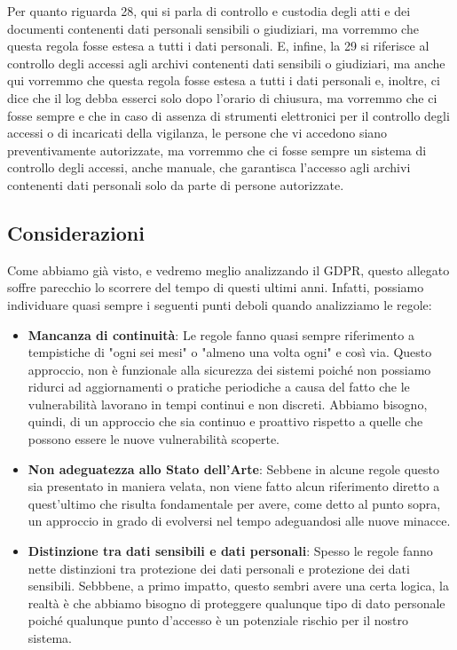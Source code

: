 Per quanto riguarda 28, qui si parla di controllo e custodia degli atti e dei documenti contenenti dati personali sensibili o giudiziari, ma vorremmo che questa regola fosse estesa a tutti i dati personali.
E, infine, la 29 si riferisce al controllo degli accessi agli archivi contenenti dati sensibili o giudiziari, ma anche qui vorremmo che questa regola fosse estesa a tutti i dati personali e, inoltre, ci dice che il log debba esserci solo dopo l'orario di chiusura, ma vorremmo che ci fosse sempre e che in caso di assenza di strumenti elettronici per il controllo degli accessi o di incaricati della vigilanza, le persone che vi accedono siano preventivamente autorizzate, ma vorremmo che ci fosse sempre un sistema di controllo degli accessi, anche manuale, che garantisca l'accesso agli archivi contenenti dati personali solo da parte di persone autorizzate.

\subsection{Considerazioni}
Come abbiamo già visto, e vedremo meglio analizzando il GDPR, questo allegato soffre parecchio lo scorrere del tempo di questi ultimi anni.
Infatti, possiamo individuare quasi sempre i seguenti punti deboli quando analizziamo le regole:
\begin{itemize}
    \item \textbf{Mancanza di continuità}: Le regole fanno quasi sempre riferimento a tempistiche di "ogni sei mesi" o "almeno una volta ogni" e così via.
    Questo approccio, non è funzionale alla sicurezza dei sistemi poiché non possiamo ridurci ad aggiornamenti o pratiche periodiche a causa del fatto che le vulnerabilità lavorano in tempi continui e non discreti.
    Abbiamo bisogno, quindi, di un approccio che sia continuo e proattivo rispetto a quelle che possono essere le nuove vulnerabilità scoperte.
    \item \textbf{Non adeguatezza allo Stato dell'Arte}: Sebbene in alcune regole questo sia presentato in maniera velata, non viene fatto alcun riferimento diretto a quest'ultimo che risulta fondamentale per avere, come detto al punto sopra, un approccio in grado di evolversi nel tempo adeguandosi alle nuove minacce.
    \item \textbf{Distinzione tra dati sensibili e dati personali}: Spesso le regole fanno nette distinzioni tra protezione dei dati personali e protezione dei dati sensibili.
    Sebbbene, a primo impatto, questo sembri avere una certa logica, la realtà è che abbiamo bisogno di proteggere qualunque tipo di dato personale poiché qualunque punto d'accesso è un potenziale rischio per il nostro sistema.
\end{itemize}

